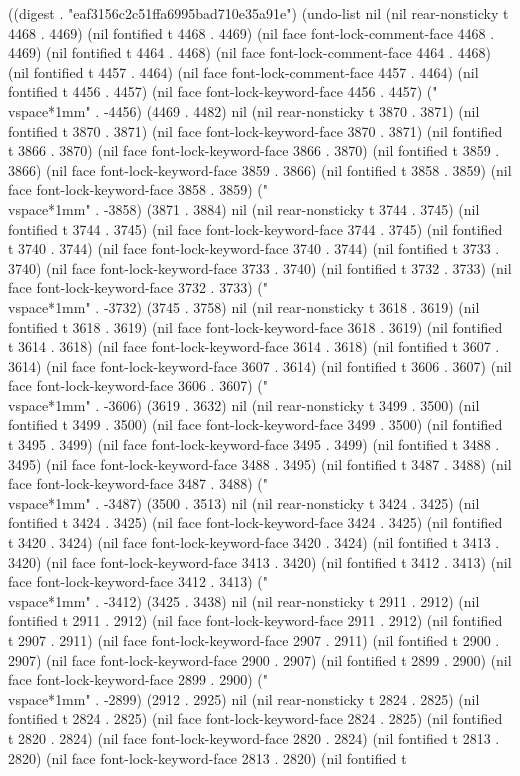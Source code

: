 
((digest . "eaf3156c2c51ffa6995bad710e35a91e") (undo-list nil (nil rear-nonsticky t 4468 . 4469) (nil fontified t 4468 . 4469) (nil face font-lock-comment-face 4468 . 4469) (nil fontified t 4464 . 4468) (nil face font-lock-comment-face 4464 . 4468) (nil fontified t 4457 . 4464) (nil face font-lock-comment-face 4457 . 4464) (nil fontified t 4456 . 4457) (nil face font-lock-keyword-face 4456 . 4457) ("\\vspace*{1mm}" . -4456) (4469 . 4482) nil (nil rear-nonsticky t 3870 . 3871) (nil fontified t 3870 . 3871) (nil face font-lock-keyword-face 3870 . 3871) (nil fontified t 3866 . 3870) (nil face font-lock-keyword-face 3866 . 3870) (nil fontified t 3859 . 3866) (nil face font-lock-keyword-face 3859 . 3866) (nil fontified t 3858 . 3859) (nil face font-lock-keyword-face 3858 . 3859) ("\\vspace*{1mm}" . -3858) (3871 . 3884) nil (nil rear-nonsticky t 3744 . 3745) (nil fontified t 3744 . 3745) (nil face font-lock-keyword-face 3744 . 3745) (nil fontified t 3740 . 3744) (nil face font-lock-keyword-face 3740 . 3744) (nil fontified t 3733 . 3740) (nil face font-lock-keyword-face 3733 . 3740) (nil fontified t 3732 . 3733) (nil face font-lock-keyword-face 3732 . 3733) ("\\vspace*{1mm}" . -3732) (3745 . 3758) nil (nil rear-nonsticky t 3618 . 3619) (nil fontified t 3618 . 3619) (nil face font-lock-keyword-face 3618 . 3619) (nil fontified t 3614 . 3618) (nil face font-lock-keyword-face 3614 . 3618) (nil fontified t 3607 . 3614) (nil face font-lock-keyword-face 3607 . 3614) (nil fontified t 3606 . 3607) (nil face font-lock-keyword-face 3606 . 3607) ("\\vspace*{1mm}" . -3606) (3619 . 3632) nil (nil rear-nonsticky t 3499 . 3500) (nil fontified t 3499 . 3500) (nil face font-lock-keyword-face 3499 . 3500) (nil fontified t 3495 . 3499) (nil face font-lock-keyword-face 3495 . 3499) (nil fontified t 3488 . 3495) (nil face font-lock-keyword-face 3488 . 3495) (nil fontified t 3487 . 3488) (nil face font-lock-keyword-face 3487 . 3488) ("\\vspace*{1mm}" . -3487) (3500 . 3513) nil (nil rear-nonsticky t 3424 . 3425) (nil fontified t 3424 . 3425) (nil face font-lock-keyword-face 3424 . 3425) (nil fontified t 3420 . 3424) (nil face font-lock-keyword-face 3420 . 3424) (nil fontified t 3413 . 3420) (nil face font-lock-keyword-face 3413 . 3420) (nil fontified t 3412 . 3413) (nil face font-lock-keyword-face 3412 . 3413) ("\\vspace*{1mm}" . -3412) (3425 . 3438) nil (nil rear-nonsticky t 2911 . 2912) (nil fontified t 2911 . 2912) (nil face font-lock-keyword-face 2911 . 2912) (nil fontified t 2907 . 2911) (nil face font-lock-keyword-face 2907 . 2911) (nil fontified t 2900 . 2907) (nil face font-lock-keyword-face 2900 . 2907) (nil fontified t 2899 . 2900) (nil face font-lock-keyword-face 2899 . 2900) ("\\vspace*{1mm}" . -2899) (2912 . 2925) nil (nil rear-nonsticky t 2824 . 2825) (nil fontified t 2824 . 2825) (nil face font-lock-keyword-face 2824 . 2825) (nil fontified t 2820 . 2824) (nil face font-lock-keyword-face 2820 . 2824) (nil fontified t 2813 . 2820) (nil face font-lock-keyword-face 2813 . 2820) (nil fontified t 